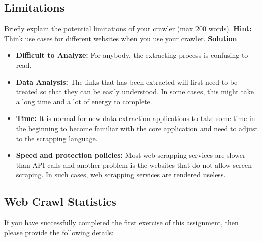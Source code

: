 \documentclass{resources/WeSTassignment}
\begin{document}
\subsection{Limitations} 
Briefly explain the potential limitations of your crawler (max 200 words). \textbf{Hint:} Think use cases for different websites when you use your crawler.
\newline
\newline
\textbf{Solution}
\begin{itemize}
    \item \textbf{Difficult to Analyze:} For anybody, the extracting process is confusing to read. 
    \item \textbf{Data Analysis:} The links that has been extracted will first need to be treated so that they can be easily understood. In some cases, this might take a long time and a lot of energy to complete.
    \item \textbf{Time:} It is normal for new data extraction applications to take some time in the beginning to become familiar with the core application and need to adjust to the scrapping language.
    \item \textbf{Speed and protection policies:} Most web scrapping services are slower than API calls and another problem is the websites that do not allow screen scraping. In such cases, web scrapping services are rendered useless.
\end{itemize}

\subsection{Web Crawl Statistics\label{web_crawl_stats}}

If you have successfully completed the first exercise of this assignment, then please provide the following details:
\end{document}
